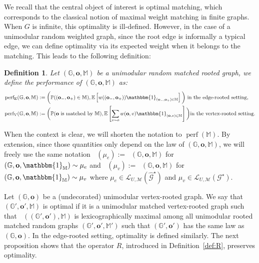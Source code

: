 \documentclass[11pt]{article}
\newtheorem{definition}[prop]{Definition}
\DeclareMathOperator{\perfE}{perf_E}
\DeclareMathOperator{\perf}{perf}
\DeclareMathOperator{\perfV}{perf_V}
\begin{document}
We recall that the central object of interest is optimal matching, which corresponds to the classical notion of maximal weight matching in finite graphs.
When $G$ is infinite, this optimality is ill-defined. However, in the case of a unimodular random weighted graph, since the root edge is informally a typical edge, we can define optimality via its expected weight when it belongs to the matching. This leads to the following definition:
\begin{definition}
    Let $(\mathbb{G}, \mathbf o, \mathbb M )$ be a unimodular random matched rooted graph, we define the performance of $(\mathbb{G},\mathbf o,\mathbb{M})$ as:
    \begin{align*}
     \perfE(\mathbb{G},\mathbf o, \mathbb{M}) &:= \bigg(\mathbb{P}((\mathbf{o}_-,\mathbf{o_+})\in \mathbb{M}), \mathbb{E}\left[ w((\mathbf{o}_-,\mathbf{o}_+))\mathbbm{1}_{(\mathbf{o}_-,\mathbf{o}_+) \in \mathbb{M}} \right]\bigg) \text{ in the edge-rooted setting,}  \\
    \perfV(\mathbb{G},\mathbf o,\mathbb{M}) &:=\bigg(\mathbb{P}( \mathbf{o} \text{ is matched by } \mathbb{M}) ,\mathbb{E}\left[ \sum_{v \sim o}w(\mathbf{o},v)\mathbbm{1}_{(\mathbf{o},v) \in \mathbb{M}} \right] \bigg)\text{in the vertex-rooted setting.} 
    \end{align*}
\end{definition}

When the context is clear, we will shorten the notation to $\perf (\mathbb{M})$. 
By extension, since those quantities only depend on the law of $(\mathbb{G},\mathbf o,\mathbb{M})$, we will freely use the same notation $\perfE(\mu_{e}):=\perfE(\mathbb{G},\mathbf{o},\mathbb{M})$ for $(\mathbb{G},\mathbf{o},\mathbbm{1}_\mathbb{M}) \sim \mu_{e}$ and $\perfV(\mu_{v}):=\perfV(\mathbb{G},\mathbf{o},\mathbb{M})$ for $(\mathbb{G},\mathbf{o},\mathbbm{1}_\mathbb{M}) \sim \mu_{v}$ where $\mu_{e}\in \mathcal{L}_{U,\mathcal{M}}(\hat{\mathcal{G}}^{\star})$ and $\mu_{v} \in \mathcal{L}_{U,\mathcal{M}}(\mathcal{G}^{\star})$.

\bigskip

Let $(\mathbb G, \mathbf o)$ be a (undecorated) unimodular vertex-rooted graph. We say that $(\mathbb{G}',\mathbf{o}',\mathbb{M})$ is optimal if it is a unimodular matched vertex-rooted graph such that $\perfV((\mathbb{G}',\mathbf{o}'),\mathbb{M})$ is lexicographically maximal among all unimodular rooted matched random graphs $(\mathbb{G}',\mathbf{o}',\mathbb{M}')$ such that $(\mathbb{G}',\mathbf{o}')$ has the same law as $(\mathbb{G},\mathbf{o})$.
In the edge-rooted setting, optimality is defined similarly.
The next proposition shows that the operator $R$, introduced in Definition~\ref{def:R}, preserves optimality.
\end{document}

